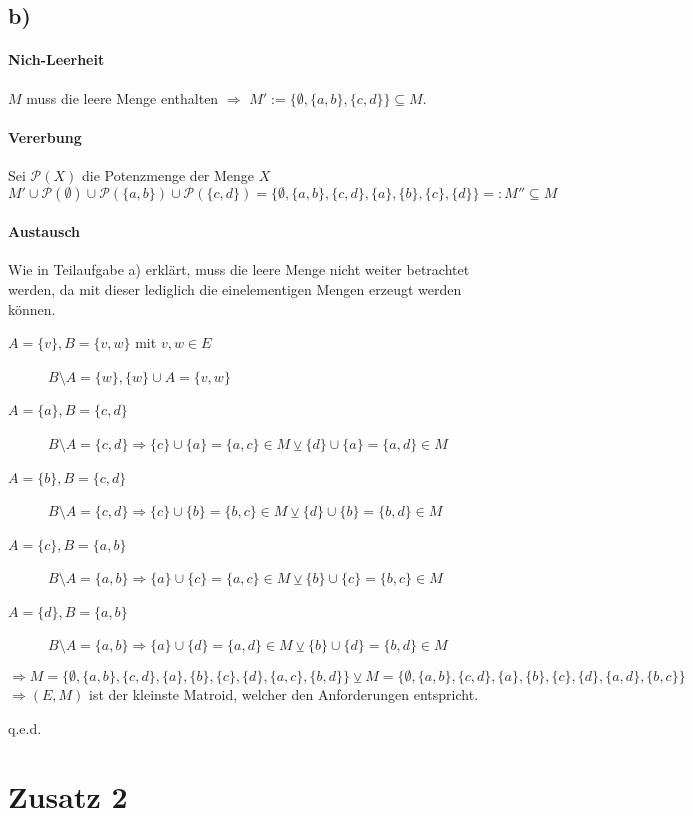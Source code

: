 \documentclass[a4paper,11pt,twoside]{scrartcl}
\begin{document}
\subsection*{b)}
\paragraph{Nich-Leerheit}
$M$ muss die leere Menge enthalten $\Rightarrow$ $M':=\{ \emptyset,\{a,b \},\{ c,d \}\}\subseteq M$.
\paragraph{Vererbung}
Sei $\mathcal{P}(X)$ die Potenzmenge der Menge $X$\\
\[ M'\cup\mathcal{P}(\emptyset)\cup\mathcal{P}(\{a,b\})\cup\mathcal{P}(\{c,d\}) = \{ \emptyset,\{a,b \},\{ c,d \},\{ a \},\{ b \},\{ c \},\{ d \} \}=:M''\subseteq M \]
\paragraph{Austausch}
Wie in Teilaufgabe a) erklärt, muss die leere Menge nicht weiter betrachtet werden, da mit dieser lediglich die einelementigen Mengen erzeugt werden können.
\begin{description}
	\item[$A=\{v\},B=\{v,w\}$ mit $v,w\in E$] $B\setminus A = \{w\}, \{w\}\cup A = \{v,w\}$
	\item[$A=\{a\},B=\{c,d\}$] $B\setminus A = \{c,d\} \Rightarrow \{c\}\cup\{a\}=\{a,c\}\in M \veebar \{d\}\cup\{a\}=\{a,d\}\in M$
	\item[$A=\{b\},B=\{c,d\}$] $B\setminus A = \{c,d\} \Rightarrow \{c\}\cup\{b\}=\{b,c\}\in M \veebar \{d\}\cup\{b\}=\{b,d\}\in M$
	\item[$A=\{c\},B=\{a,b\}$] $B\setminus A = \{a,b\} \Rightarrow \{a\}\cup\{c\}=\{a,c\}\in M \veebar \{b\}\cup\{c\}=\{b,c\}\in M$
	\item[$A=\{d\},B=\{a,b\}$] $B\setminus A = \{a,b\} \Rightarrow \{a\}\cup\{d\}=\{a,d\}\in M \veebar \{b\}\cup\{d\}=\{b,d\}\in M$
\end{description}
\[\Rightarrow M=\{ \emptyset,\{a,b \},\{ c,d \},\{ a \},\{ b \},\{ c \},\{ d \},\{a,c\},\{b,d\} \}\veebar M=\{ \emptyset,\{a,b \},\{ c,d \},\{ a \},\{ b \},\{ c \},\{ d \},\{a,d\},\{b,c\} \}\]
$\Rightarrow(E,M)$ ist der kleinste Matroid, welcher den Anforderungen entspricht.
\begin{flushright}
	q.e.d.
\end{flushright}
\pagebreak
\section*{Zusatz 2}
\end{document}
